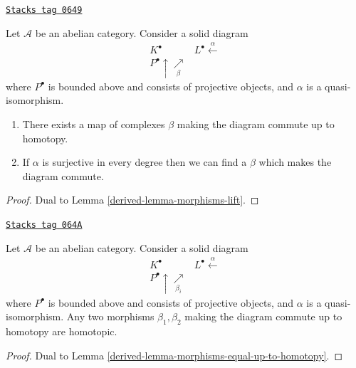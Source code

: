 \begin{lemma}
\label{derived-lemma-morphisms-lift-projective}
\href{https://stacks.math.columbia.edu/tag/0649}{\texttt{Stacks tag 0649}}

Let $\mathcal{A}$ be an abelian category.
Consider a solid diagram
$$
\begin{array}{cc}K^\bullet & L^\bullet \overset{\alpha}{\longleftarrow} \\ P^\bullet \uparrow\underset{\beta}{\nearrow} & \end{array}
$$
where $P^\bullet$ is bounded above and consists of projective
objects, and $\alpha$ is a quasi-isomorphism.
\begin{enumerate}
\item There exists a map of complexes $\beta$ making the diagram
commute up to homotopy.
\item If $\alpha$ is surjective in every degree
then we can find a $\beta$ which makes the diagram commute.
\end{enumerate}
\end{lemma}

\begin{proof}

Dual to
Lemma \ref{derived-lemma-morphisms-lift}.
\end{proof}

\begin{lemma}
\label{derived-lemma-morphisms-equal-up-to-homotopy-projective}
\href{https://stacks.math.columbia.edu/tag/064A}{\texttt{Stacks tag 064A}}

Let $\mathcal{A}$ be an abelian category. Consider a solid diagram
$$
\begin{array}{cc}K^\bullet & L^\bullet \overset{\alpha}{\longleftarrow} \\ P^\bullet \uparrow\underset{\beta_i}{\nearrow} & \end{array}
$$
where $P^\bullet$ is bounded above and consists of projective
objects, and $\alpha$ is a quasi-isomorphism.
Any two morphisms $\beta_1, \beta_2$ making the diagram commute
up to homotopy are homotopic.
\end{lemma}

\begin{proof}

Dual to
Lemma \ref{derived-lemma-morphisms-equal-up-to-homotopy}.
\end{proof}

